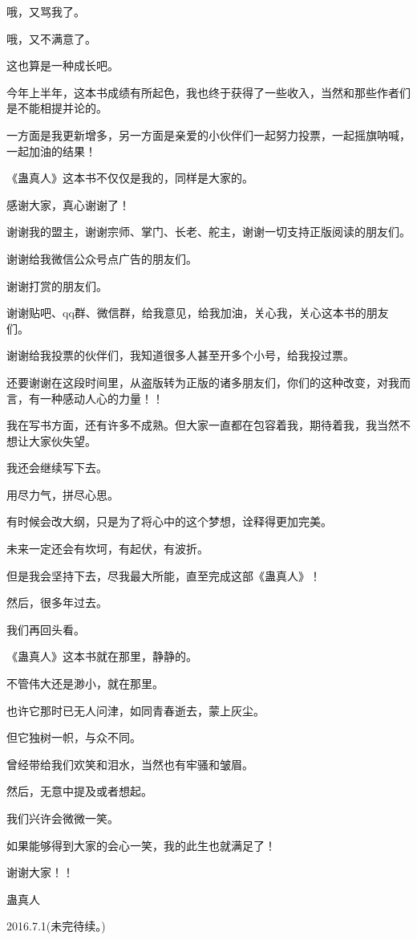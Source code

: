 \begin{this_body}
哦，又骂我了。

哦，又不满意了。

这也算是一种成长吧。

今年上半年，这本书成绩有所起色，我也终于获得了一些收入，当然和那些作者们是不能相提并论的。

一方面是我更新增多，另一方面是亲爱的小伙伴们一起努力投票，一起摇旗呐喊，一起加油的结果！

《蛊真人》这本书不仅仅是我的，同样是大家的。

感谢大家，真心谢谢了！

谢谢我的盟主，谢谢宗师、掌门、长老、舵主，谢谢一切支持正版阅读的朋友们。

谢谢给我微信公众号点广告的朋友们。

谢谢打赏的朋友们。

谢谢贴吧、qq群、微信群，给我意见，给我加油，关心我，关心这本书的朋友们。

谢谢给我投票的伙伴们，我知道很多人甚至开多个小号，给我投过票。

还要谢谢在这段时间里，从盗版转为正版的诸多朋友们，你们的这种改变，对我而言，有一种感动人心的力量！！

我在写书方面，还有许多不成熟。但大家一直都在包容着我，期待着我，我当然不想让大家伙失望。

我还会继续写下去。

用尽力气，拼尽心思。

有时候会改大纲，只是为了将心中的这个梦想，诠释得更加完美。

未来一定还会有坎坷，有起伏，有波折。

但是我会坚持下去，尽我最大所能，直至完成这部《蛊真人》！

然后，很多年过去。

我们再回头看。

《蛊真人》这本书就在那里，静静的。

不管伟大还是渺小，就在那里。

也许它那时已无人问津，如同青春逝去，蒙上灰尘。

但它独树一帜，与众不同。

曾经带给我们欢笑和泪水，当然也有牢骚和皱眉。

然后，无意中提及或者想起。

我们兴许会微微一笑。

如果能够得到大家的会心一笑，我的此生也就满足了！

谢谢大家！！

蛊真人

2016.7.1(未完待续。)

\end{this_body}

